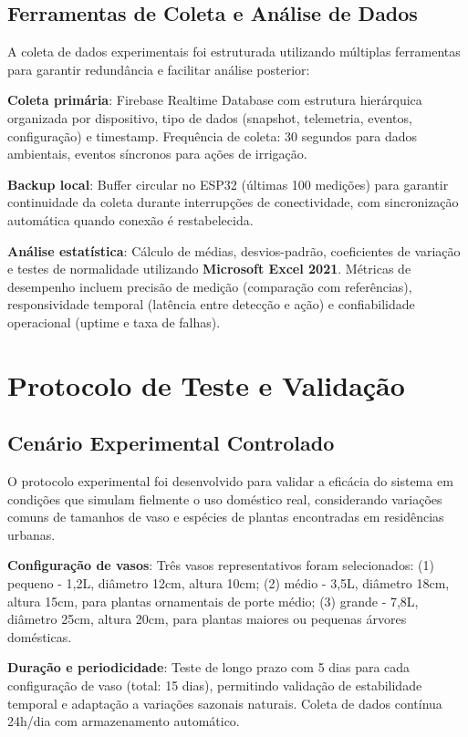 \documentclass[twoside,english,brazilian]{UNISINOSmonografia}
\begin{document}
\subsection{Ferramentas de Coleta e Análise de Dados}

A coleta de dados experimentais foi estruturada utilizando múltiplas ferramentas para garantir redundância e facilitar análise posterior:

\textbf{Coleta primária}: Firebase Realtime Database com estrutura hierárquica organizada por dispositivo, tipo de dados (snapshot, telemetria, eventos, configuração) e timestamp. Frequência de coleta: 30 segundos para dados ambientais, eventos síncronos para ações de irrigação.

\textbf{Backup local}: Buffer circular no ESP32 (últimas 100 medições) para garantir continuidade da coleta durante interrupções de conectividade, com sincronização automática quando conexão é restabelecida.

\textbf{Análise estatística}: Cálculo de médias, desvios-padrão, coeficientes de variação e testes de normalidade utilizando \textbf{Microsoft Excel 2021}. Métricas de desempenho incluem precisão de medição (comparação com referências), responsividade temporal (latência entre detecção e ação) e confiabilidade operacional (uptime e taxa de falhas).

\section{Protocolo de Teste e Validação}

\subsection{Cenário Experimental Controlado}

O protocolo experimental foi desenvolvido para validar a eficácia do sistema em condições que simulam fielmente o uso doméstico real, considerando variações comuns de tamanhos de vaso e espécies de plantas encontradas em residências urbanas.

\textbf{Configuração de vasos}: Três vasos representativos foram selecionados: (1) pequeno - 1,2L, diâmetro 12cm, altura 10cm; (2) médio - 3,5L, diâmetro 18cm, altura 15cm, para plantas ornamentais de porte médio; (3) grande - 7,8L, diâmetro 25cm, altura 20cm, para plantas maiores ou pequenas árvores domésticas.

\textbf{Duração e periodicidade}: Teste de longo prazo com 5 dias para cada configuração de vaso (total: 15 dias), permitindo validação de estabilidade temporal e adaptação a variações sazonais naturais. Coleta de dados contínua 24h/dia com armazenamento automático.
\end{document}
